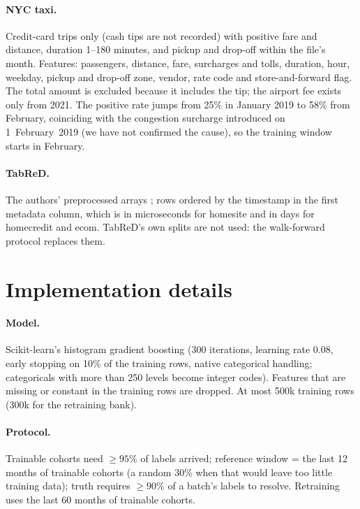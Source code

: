 \documentclass[11pt]{article}
\begin{document}
\paragraph{NYC taxi.} Credit-card trips only (cash tips are not recorded) with positive fare and
distance, duration 1--180 minutes, and pickup and drop-off within the file's month. Features:
passengers, distance, fare, surcharges and tolls, duration, hour, weekday, pickup and drop-off
zone, vendor, rate code and store-and-forward flag. The total amount is excluded because it
includes the tip; the airport fee exists only from 2021. The positive rate jumps from 25\% in
January 2019 to 58\% from February, coinciding with the congestion surcharge introduced on
1~February~2019 (we have not confirmed the cause), so the training window starts in February.

\paragraph{TabReD.} The authors' preprocessed arrays \citep{rubachev2024tabred}; rows ordered by the
timestamp in the first metadata column, which is in microseconds for homesite and in days for
homecredit and ecom. TabReD's own splits are not used: the walk-forward protocol replaces them.

\section{Implementation details}\label{app:impl}

\paragraph{Model.} Scikit-learn's histogram gradient boosting (300 iterations, learning rate 0.08,
early stopping on 10\% of the training rows, native categorical handling; categoricals with more
than 250 levels become integer codes). Features that are missing or constant in the training rows
are dropped. At most 500k training rows (300k for the retraining bank).

\paragraph{Protocol.} Trainable cohorts need $\ge 95\%$ of labels arrived; reference window = the last
12 months of trainable cohorts (a random 30\% when that would leave too little training data); truth
requires $\ge 90\%$ of a batch's labels to resolve. Retraining uses the last 60 months of trainable
cohorts.
\end{document}
